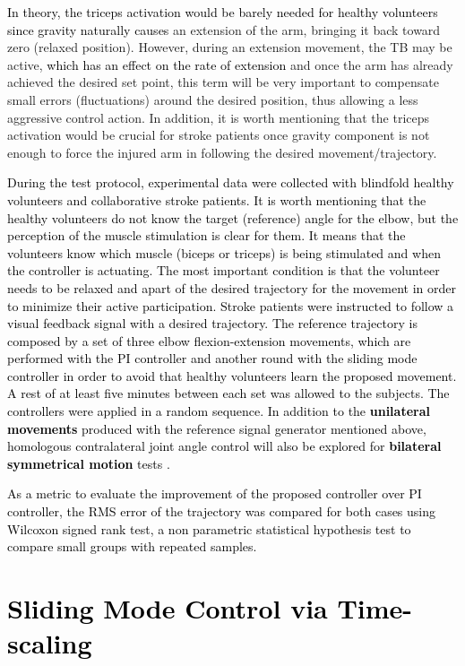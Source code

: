 \documentclass[review]{elsarticle}
\begin{document}
\textcolor{black}{In theory, the triceps activation would be barely
needed for healthy volunteers since gravity naturally }\textcolor{black}{causes}
an extension of the arm, bringing it back toward zero (relaxed position).
However, during an extension movement, the TB may be active, \textcolor{black}{which
has an effect on the rate of extension} and once the arm has already
achieved the desired set point, this term will be very important to
compensate small errors (fluctuations) around the desired position,
thus allowing a less aggressive control action. In addition, it is
worth mentioning that the triceps activation would be crucial for
stroke patients once gravity component is not enough to force the
injured arm in following the desired movement/trajectory.


\textcolor{black}{During the test protocol, experimental data were
collected with blindfold healthy volunteers and
collaborative stroke patients. It is worth mentioning that the healthy 
volunteers do not know the target (reference) angle for the elbow,
but the perception of the muscle stimulation is clear for them. It
means that the volunteers know which muscle (biceps
or triceps) is being stimulated and when the controller is actuating.
The most important condition is that the volunteer needs
to be relaxed and apart of the desired trajectory for the movement
in order to minimize their active participation. Stroke
patients were instructed to follow a visual feedback signal with a desired
trajectory. The reference trajectory is composed by a set of three  elbow
flexion-extension movements, which are performed with the
PI controller and another round with the sliding mode controller in order 
to avoid that healthy volunteers learn the proposed movement. A rest of at least five
minutes between each set was allowed to the subjects. The controllers were
applied in a random sequence. In addition to the \textbf{unilateral
movements} produced with the reference signal generator mentioned
above, homologous contralateral joint angle control will also be explored
for \textbf{bilateral symmetrical motion} tests \cite{SFYLS:2012}.}

\textcolor{black}{As a metric to evaluate the improvement of the proposed controller over PI controller, the RMS error of the trajectory was compared for both cases using Wilcoxon signed rank test, a non parametric statistical  hypothesis test to compare small groups with repeated samples.}



\section{\textcolor{black}{Sliding Mode Control via Time-scaling}}
\end{document}
